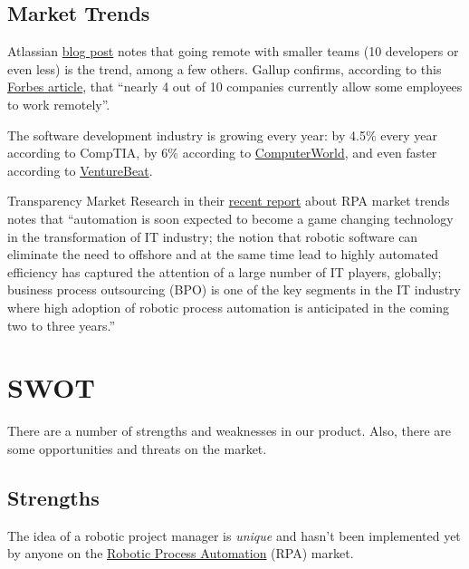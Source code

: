 \documentclass{main}
\begin{document}
\subsection{Market Trends}

Atlassian \href{https://blogs.atlassian.com/2016/03/software-development-trends-2016/}{blog post}
notes that going remote with smaller teams (10 developers or
even less) is the trend, among a few others. Gallup confirms, according to this
\href{https://www.forbes.com/sites/davidsturt/2014/05/14/working-remotely-does-the-research-prove-it-wont-work-for-you/#9a6518966ac4}{Forbes article},
that ``nearly 4 out of 10 companies currently allow some
employees to work remotely''.

The software development industry is growing every year: by 4.5\% every year
according to CompTIA, by 6\% according to \href{http://www.computerworld.com/article/2502348/it-management/it-jobs-will-grow-22--through-2020--says-u-s-.html}{ComputerWorld},
and even faster
according to \href{http://venturebeat.com/2013/10/17/listen-up-investors-the-software-industry-is-growing-quickly-and-in-unexpected-places/}{VentureBeat}.

Transparency Market Research in their \href{http://www.transparencymarketresearch.com/it-robotic-automation-market.html}{recent report} about RPA market trends
notes that ``automation is soon expected to become a game changing technology in
the transformation of IT industry; the notion that robotic software can
eliminate the need to offshore and at the same time lead to highly automated
efficiency has captured the attention of a large number of IT players, globally;
business process outsourcing (BPO) is one of the key segments in the IT industry
where high adoption of robotic process automation is anticipated in the coming
two to three years.''

\section{SWOT}

There are a number of strengths and weaknesses in our product. Also, there are
some opportunities and threats on the market.

\subsection{Strengths}

The idea of a robotic project manager is \emph{unique} and hasn't been implemented yet
by anyone on the \href{https://en.wikipedia.org/wiki/Robotic_Process_Automation}{Robotic Process Automation} (RPA) market.
\end{document}
